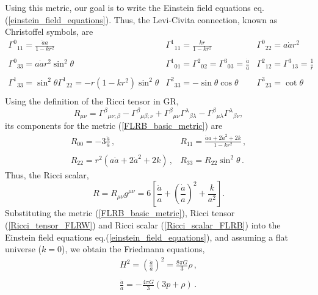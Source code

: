 \documentclass{book}
\begin{document}
	Using this metric, our goal is to write the Einstein field equations eq.(\ref{einstein_field_equations}). Thus, the Levi-Civita connection, known as Christoffel symbols, are
	\begin{equation*}
		\begin{array}{ccc}
			{\Gamma^0}_{11}=\frac{\dot a a}{1-kr^2} & {\Gamma^1}_{11}=\frac{kr}{1-kr^2} & {\Gamma^0}_{22}=a\dot a r^2 \\
			\, & \, & \, \\
			{\Gamma^0}_{33}=a \dot a r^2 \sin^2\theta & {\Gamma^1}_{01}={\Gamma^2}_{02}={\Gamma^3}_{03}=\frac{\dot a}{a} & {\Gamma^2}_{12}={\Gamma^3}_{13}=\frac{1}{r} \\
			\, & \, & \, \\
			{\Gamma^1}_{33}=\sin^2\theta{\Gamma^1}_{22}=-r(1-kr^2)\sin^2\theta & {\Gamma^2}_{33}=-\sin\theta\cos\theta & {\Gamma^3}_{23}=\cot\theta \\
		\end{array}
	\end{equation*}
	Using the definition of the Ricci tensor in GR,
	\begin{equation}
		\label{Ricci-Tensor}
		R_{\mu\nu}={\Gamma^\beta}_{\mu\nu;\beta}-{\Gamma^\beta}_{\mu\beta;\nu}+{\Gamma^\beta}_{\mu\nu}{\Gamma^\lambda}_{\beta\lambda}-{\Gamma^\beta}_{\mu\lambda}{\Gamma^\lambda}_{\beta\nu},
	\end{equation}
	its components for the metric (\ref{FLRB_basic_metric}) are
	\begin{equation}
		\label{Ricci_tensor_FLRW}
		\begin{array}{cc}
			R_{00}=-3\frac{\dot a}{a} \, , &
			R_{11}=\frac{\ddot{a}a+2\dot a ^2+2k}{1-kr^2} \, , \\ \, \\
			R_{22}=r^2(a\ddot a + 2\dot a ^2 +2k) \, , &
			R_{33}=R_{22}\sin^2\theta \, .
		\end{array}
	\end{equation}
	Thus, the Ricci scalar,
	\begin{equation}
		\label{Ricci_scalar_FLRB}
		R=R_{\mu\nu}g^{\mu\nu}=6\left[\frac{\ddot a}{a}+\left(\frac{\dot a}{a}\right)^2+\frac{k}{a^2}\right].
	\end{equation}
	Substituting the metric (\ref{FLRB_basic_metric}), Ricci tensor (\ref{Ricci_tensor_FLRW}) and Ricci scalar (\ref{Ricci_scalar_FLRB}) into the Einstein field equations eq.(\ref{einstein_field_equations}), and assuming a flat universe ($k=0$), we obtain the Friedmann equations,
	\begin{equation}
		\label{Friedmann_equations}
		\begin{array}{c}
			H^2=\left(\frac{\dot a}{a}\right)^2=\frac{8\pi G}{3}\rho \, , \\ \, \\
			\frac{\ddot a}{a}=-\frac{4\pi G}{3}(3p+\rho) \, .
		\end{array}
	\end{equation}
\end{document}

